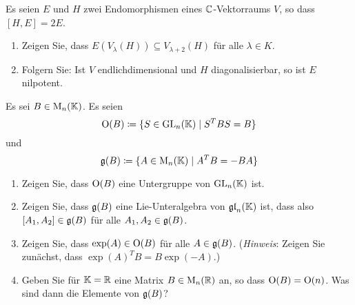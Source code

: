 \documentclass[a4paper,10pt]{scrartcl}
\begin{document}
\begin{question}
  Es seien $E$ und $H$ zwei Endomorphismen eines $\mathbb{C}$-Vektorraums $V$, so dass $[H,E] = 2E$.
  \begin{enumerate}[leftmargin=*]
    \item
      Zeigen Sie, dass $E(V_\lambda(H)) \subseteq V_{\lambda + 2}(H)$ für alle $\lambda \in K$.
    \item
      Folgern Sie: Ist $V$ endlichdimensional und $H$ diagonalisierbar, so ist $E$ nilpotent.
  \end{enumerate}
\end{question}


\begin{question}
  Es sei $B \in \operatorname{M}_n(\mathbb{K})$.
  Es seien
  \[
              \operatorname{O}(B)
    \coloneqq \{ S \in \operatorname{GL}_n(\mathbb{K}) \mid S^T B S = B \}
  \]
  und
  \[          \mathfrak{g}(B)
    \coloneqq \{ A \in \operatorname{M}_n(\mathbb{K}) \mid A^T B = - B A \}
  \]
  \begin{enumerate}[leftmargin=*]
    \item
      Zeigen Sie, dass $\operatorname{O}(B)$ eine Untergruppe von $\operatorname{GL}_n(\mathbb{K})$ ist.
    \item
      Zeigen Sie, dass $\mathfrak{g}(B)$ eine Lie-Unteralgebra von $\mathfrak{gl}_n(\mathbb{K})$ ist, dass also $[A_1, A_2] \in \mathfrak{g}(B)$ für alle $A_1, A_2 \in \mathfrak{g}(B)$.
    \item
      Zeigen Sie, dass $\exp(A) \in \operatorname{O}(B)$ für alle $A \in \mathfrak{g}(B)$.
      (\emph{Hinweis}:
       Zeigen Sie zunächst, dass $\exp(A)^T B = B \exp(-A)$.)
    \item
      Geben Sie für $\mathbb{K} = \mathbb{R}$ eine Matrix $B \in \operatorname{M}_n(\mathbb{R})$ an, so dass $\operatorname{O}(B) = \operatorname{O}(n)$.
      Was sind dann die Elemente von $\mathfrak{g}(B)$?
  \end{enumerate}
\end{question}
\end{document}
